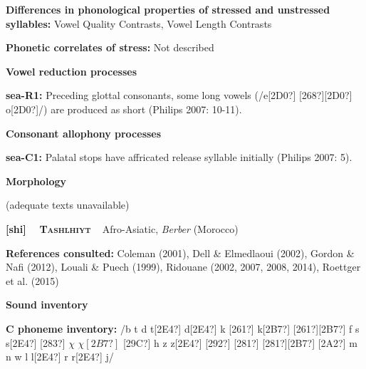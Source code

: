 \begin{styleBody}
\textbf{Differences in phonological properties of stressed and unstressed syllables:} Vowel Quality Contrasts, Vowel Length Contrasts
\end{styleBody}

\begin{styleBody}
\textbf{Phonetic correlates of stress: }Not described
\end{styleBody}

\begin{styleBody}
\textbf{Vowel reduction processes}
\end{styleBody}

\begin{styleBody}
\textbf{sea-R1:} Preceding glottal consonants, some long vowels (/e[2D0?] [268?][2D0?] o[2D0?]/) are produced as short (Philips 2007: 10-11).
\end{styleBody}

\begin{styleBody}
\textbf{Consonant allophony processes}
\end{styleBody}

\begin{styleBody}
\textbf{sea-C1: }Palatal stops have affricated release syllable initially (Philips 2007: 5).
\end{styleBody}

\begin{styleBody}
\textbf{Morphology}
\end{styleBody}

\begin{styleBody}
(adequate texts unavailable)
\end{styleBody}

\clearpage\begin{styleBody}
\textbf{[shi] }\ \ \textbf{\textsc{Tashlhiyt}}\textbf{\ \ }Afro-Asiatic, \textit{Berber} (Morocco)
\end{styleBody}

\begin{styleBody}
\textbf{References consulted: }Coleman (2001), Dell \& Elmedlaoui (2002), Gordon \& Nafi (2012), Louali \& Puech (1999), Ridouane (2002, 2007, 2008, 2014), Roettger et al. (2015)
\end{styleBody}

\begin{styleBody}
\textbf{Sound inventory}
\end{styleBody}

\begin{styleBody}
\textbf{C phoneme inventory:} /b t d t[2E4?] d[2E4?] k [261?] k[2B7?] [261?][2B7?] f s s[2E4?] [283?] $\chi $ $\chi [2B7?]$ [29C?] h z z[2E4?] [292?] [281?] [281?][2B7?] [2A2?] m n w l l[2E4?] r r[2E4?] j/
\end{styleBody}

